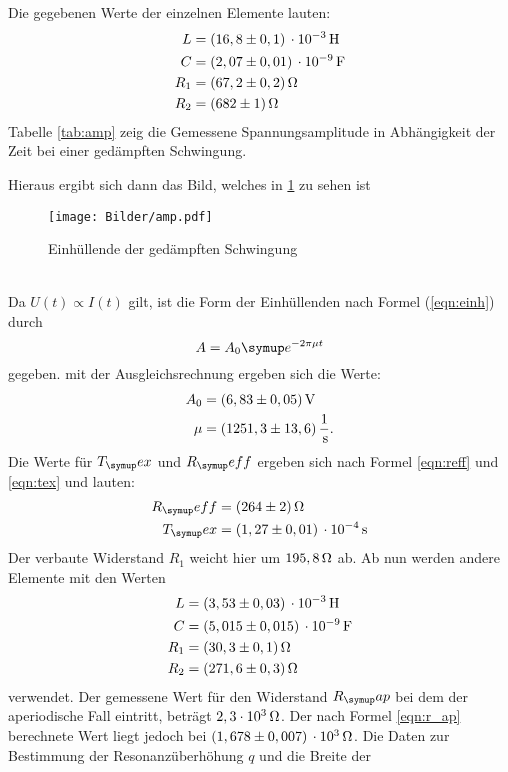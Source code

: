 Die gegebenen Werte der einzelnen Elemente lauten:
\begin{align*}
  L &= (16,8 \pm 0,1) \,\cdot 10^{-3}\Hen \\
  C &= (2,07 \pm 0,01) \,\cdot 10^{-9} \Far \\
  R_1 &= (67,2 \pm 0,2) \Ohm \\
  R_2 &= (682 \pm 1) \Ohm
\end{align*}
Tabelle \ref{tab:amp} zeig die Gemessene Spannungsamplitude in Abhängigkeit der Zeit bei
einer gedämpften Schwingung.

Hieraus ergibt sich dann das Bild, welches in \ref{fig:AMP} zu sehen ist
\begin{figure}[h]
  \centering
  \texttt{[image: Bilder/amp.pdf]}
  \caption{Einhüllende der gedämpften Schwingung}
  \label{fig:AMP}
\end{figure}
\\
Da $U(t)\propto I(t)$ gilt, ist die Form der Einhüllenden nach Formel
(\ref{eqn:einh}) durch
\begin{equation}
  A = A_0\su{e}^{-2\pi\mu t}
\end{equation}
gegeben.
mit der Ausgleichsrechnung ergeben sich die Werte:
\begin{align*}
  A_0 &= (6,83 \pm 0,05)\,\si{\volt}\\
  \mu &= (1251,3 \pm 13,6)\,\frac{1}{\,\si{\second}}.
\end{align*}
Die Werte für $T_\su{ex}$ und $R_\su{eff}$ ergeben sich nach Formel \eqref{eqn:reff}
und \eqref{eqn:tex} und lauten:
\begin{align*}
  R_\su{eff} &= (264 \pm 2)\Ohm \\ %
  T_\su{ex}  &= (1,27 \pm 0,01)\,\cdot 10^{-4}\sek
\end{align*}
Der verbaute Widerstand $R_1$ weicht hier um $195,8\,\si{\ohm}$ ab.
Ab nun werden andere Elemente mit den Werten
\begin{align*}
  L &= (3,53 \pm 0,03) \,\cdot 10^{-3}\Hen \\
  C &= (5,015 \pm 0,015) \,\cdot 10^{-9} \Far \\
  R_1 &= (30,3 \pm 0,1) \Ohm \\
  R_2 &= (271,6 \pm 0,3) \Ohm
\end{align*}
verwendet.
Der gemessene Wert für den Widerstand $R_\su{ap}$ bei dem der aperiodische Fall
eintritt, beträgt $2,3\cdot 10^3 \,\si{\ohm}$. Der nach Formel \eqref{eqn:r_ap}
berechnete Wert liegt jedoch bei $(1,678 \pm 0,007)\,\cdot 10^3\,\si{\ohm}$. 
Die Daten zur Bestimmung der Resonanzüberhöhung $q$ und die Breite der
